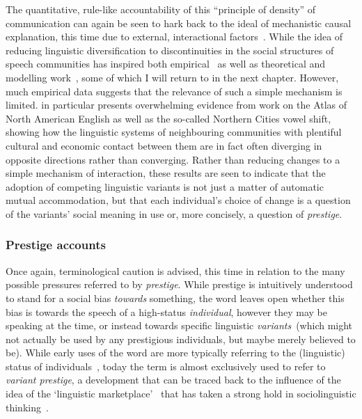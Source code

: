 The quantitative, rule-like accountability of this ``principle of density'' of communication can again be seen to hark back to the ideal of mechanistic causal explanation, this time due to external, interactional factors~\citep[p.19]{Labov2001}. While the idea of reducing linguistic diversification to discontinuities in the social structures of speech communities has inspired both empirical~\citep{Milroy1985,Herold1997,Trudgill2008} as well as theoretical and modelling work~\citep{Nettle1999,Silva2008,Gong2012,Blythe2012,Pierrehumbert2014}, some of which I will return to in the next chapter.
However, much empirical data suggests that the relevance of such a simple mechanism is limited.
\citet[ch.6-10]{Labov2010} in particular presents overwhelming evidence from work on the Atlas of North American English as well as the so-called Northern Cities vowel shift, showing how the linguistic systems of neighbouring communities with plentiful cultural and economic contact between them are in fact often diverging in opposite directions rather than converging. Rather than reducing changes to a simple mechanism of interaction, these results are seen to indicate that the adoption of competing linguistic variants is not just a matter of automatic mutual accommodation, but that each individual's choice of change is a question of the variants' social meaning in use or, more concisely, a question of \emph{prestige}.


\subsubsection{Prestige accounts}
\label{sec:prestige}

Once again, terminological caution is advised, this time in relation to the many possible pressures referred to by \emph{prestige}. While prestige is intuitively understood to stand for a social bias \emph{towards} something, the word leaves open whether this bias is towards the speech of a high-status \emph{individual}, however they may be speaking at the time, or instead towards specific linguistic \emph{variants}~(which might not actually be used by any prestigious individuals, but maybe merely believed to be). While early uses of the word are more typically referring to the (linguistic) status of individuals~\citep{Tarde1903,Fries1949}, today the term is almost exclusively used to refer to \emph{variant prestige}, a development that can be traced back to the influence of the idea of the `linguistic marketplace'~\citep{Bourdieu1977} that has taken a strong hold in sociolinguistic thinking~\citep{LePage1985,Cedergren1987,Tagliamonte2015}.

